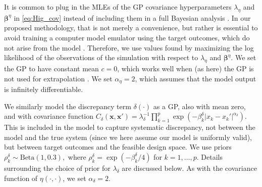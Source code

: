 \documentclass[12pt]{article}
\begin{document}
%
It is common to plug in the MLEs of the GP covariance hyperparameters $\lambda_\eta$ and $\boldsymbol \beta^\eta$ in \eqref{eq:Hig_cov} instead of including them in a full Bayesian analysis \citep{Kennedy2001,Santner2003a,Qian2008,Paulo2012}.
%
In our proposed methodology, that is not merely a convenience, but rather is essential 
%
%
%
%
to avoid training a computer model emulator using the target outcomes, which do not arise from the model \citep[see][on the dangers of training an emulator on inappropriate data]{Liu2009}.
%
Therefore, we use values found by maximizing the log likelihood of the observations of the simulation with respect to $\lambda_\eta$ and $\boldsymbol\beta^\eta$.
%
We set the GP to have constant mean $c=0$, which works well when (as here) the GP is not used for extrapolation \citep{Bayarri2007}.
%
We set $\alpha_\eta = 2$, which assumes that the model output is infinitely differentiable.

We similarly model the discrepancy term $\delta(\cdot)$ as a GP, also with mean zero, and with covariance function
%
$C_\delta(\mathbf x,\mathbf x') = \lambda_\delta^{-1} \prod_{k=1}^p
\exp\left( -\beta_k^\delta |x_k-x_k'|^{\alpha_\delta} \right).$
%
This is included in the model to capture systematic discrepancy, not between the model and the true system (since we here assume our model is uniformly valid), but between target outcomes and the feasible design space.
%
We use priors
$\rho^\delta_k \sim \mathrm{Beta}(1,0.3),$
where $\rho_k^\delta = \exp(-\beta_k^\delta/4)$ for $k=1,\ldots,p$. 
%
%
%
Details surrounding the choice of prior for $\lambda_\delta$ are discussed below.
%
As with the covariance function of $\eta(\cdot,\cdot)$, we set $\alpha_\delta=2$.
\end{document}
